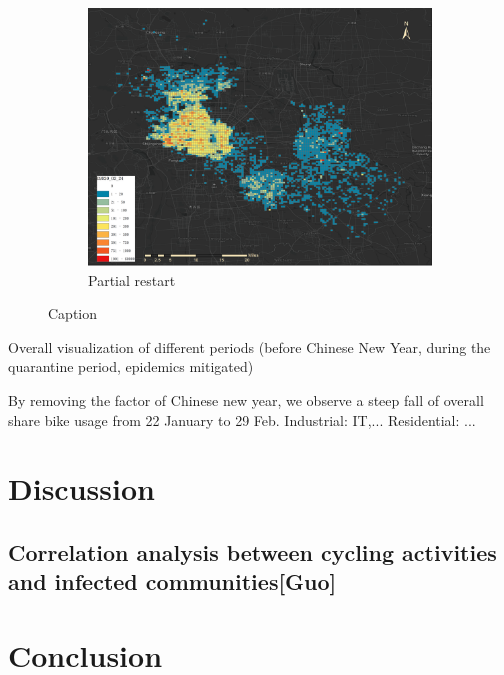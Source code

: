 \documentclass[preprints,ijgi,submit,moreauthors]{Definitions/mdpi}
\begin{document}
\begin{figure}[H]
\begin{subfigure}{.3\textwidth}
        \includegraphics[width=\textwidth]{Definitions/D2020_02_24.png}
        \caption{Partial restart}
    \end{subfigure}
    \centering
    \caption{Caption}
    \label{fig:my_label}
\end{figure}

Overall visualization of different periods (before Chinese New Year, during the quarantine period, epidemics mitigated)

By removing the factor of Chinese new year, we observe a steep fall of overall share bike usage from 22 January to 29 Feb.
Industrial: IT,...
Residential: ...


\section{Discussion}
\subsection{Correlation analysis between cycling activities and infected communities\textbf{[Guo]}}

\section{Conclusion}


\vspace{6pt} 

\end{document}
